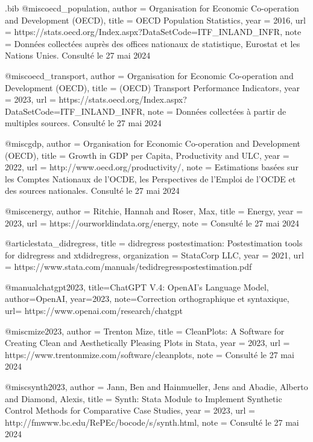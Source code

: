 \begin{filecontents}{.bib}
@misc{oecd_population,
  author = {Organisation for Economic Co-operation and Development (OECD)},
  title = {OECD Population Statistics},
  year = {2016},
  url = {https://stats.oecd.org/Index.aspx?DataSetCode=ITF_INLAND_INFR},
  note = {Données collectées auprès des offices nationaux de statistique, Eurostat et les Nations Unies. Consulté le 27 mai 2024}
}


@misc{oecd_transport,
  author = {Organisation for Economic Co-operation and Development (OECD)},
  title = {(OECD) Transport Performance Indicators},
  year = {2023},
  url = {https://stats.oecd.org/Index.aspx?DataSetCode=ITF_INLAND_INFR},
  note = {Données collectées à partir de multiples sources. Consulté le 27 mai 2024}
}

@misc{gdp,
  author = {Organisation for Economic Co-operation and Development (OECD)},
  title = {Growth in GDP per Capita, Productivity and ULC},
  year = {2022},
  url = {http://www.oecd.org/productivity/},
  note = {Estimations basées sur les Comptes Nationaux de l'OCDE, les Perspectives de l'Emploi de l'OCDE et des sources nationales. Consulté le 27 mai 2024}
}

@misc{energy,
  author = {Ritchie, Hannah and Roser, Max},
  title = {Energy},
  year = {2023},
  url = {https://ourworldindata.org/energy},
  note = {Consulté le 27 mai 2024}
}

@article{stata_didregress,
  title = {didregress postestimation: Postestimation tools for didregress and xtdidregress},
  organization = {StataCorp LLC},
  year = {2021},
  url = {https://www.stata.com/manuals/tedidregresspostestimation.pdf}
}

@manual{chatgpt2023,
  title={ChatGPT V.4: OpenAI’s Language Model},
  author={OpenAI},
  year={2023},
  note={Correction orthographique et syntaxique},
  url= {https://www.openai.com/research/chatgpt}
}

@misc{mize2023,
  author = {Trenton Mize},
  title = {CleanPlots: A Software for Creating Clean and Aesthetically Pleasing Plots in Stata},
  year = {2023},
  url = {https://www.trentonmize.com/software/cleanplots},
  note = {Consulté le 27 mai 2024}
}


@misc{synth2023,
  author = {Jann, Ben and Hainmueller, Jens and Abadie, Alberto and Diamond, Alexis},
  title = {Synth: Stata Module to Implement Synthetic Control Methods for Comparative Case Studies},
  year = {2023},
  url = {http://fmwww.bc.edu/RePEc/bocode/s/synth.html},
  note = {Consulté le 27 mai 2024}
}



\end{filecontents}



